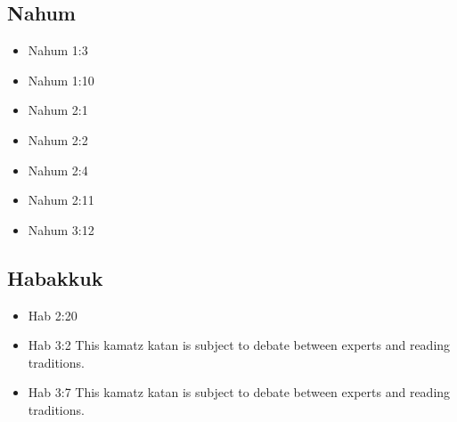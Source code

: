 \documentclass[14pt]{book}
\begin{document}
															\subsection{Nahum}
														\begin{multicols}{2}\begin{itemize}
																
																\item Nahum 1:3
											
																		
																		\item Nahum 1:10
																		
																		\item Nahum 2:1
																				
																				\item Nahum 2:2
																				
																				\item Nahum 2:4
																				
																				\item Nahum 2:11
																				
																				\item Nahum 3:12
																				
																												\end{itemize}\end{multicols}
																			\subsection{Habakkuk}
																		\begin{multicols}{2}\begin{itemize}
																				
																				\item Hab 2:20\hebword{קׇדְשׁ֑וֹ}
																				
																				\item Hab 3:2 This kamatz katan is subject to debate between experts and reading traditions.
																				
																				\item Hab 3:7 This kamatz katan is subject to debate between experts and reading traditions.
																				
																												\end{itemize}\end{multicols}
\end{document}
